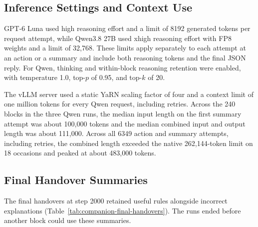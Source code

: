 \subsection{Inference Settings and Context Use}

GPT-6 Luna used high reasoning effort and a limit of 8192 generated tokens per request attempt, while Qwen3.8 27B used xhigh reasoning effort with FP8 weights and a limit of 32,768.
These limits apply separately to each attempt at an action or a summary and include both reasoning tokens and the final JSON reply.
For Qwen, thinking and within-block reasoning retention were enabled, with temperature 1.0, top-$p$ of 0.95, and top-$k$ of 20.

The vLLM server used a static YaRN scaling factor of four and a context limit of one million tokens for every Qwen request, including retries.
Across the 240 blocks in the three Qwen runs, the median input length on the first summary attempt was about 100,000 tokens and the median combined input and output length was about 111,000.
Across all 6349 action and summary attempts, including retries, the combined length exceeded the native 262,144-token limit on 18 occasions and peaked at about 483,000 tokens.

\newpage
\subsection{Final Handover Summaries}
\label{app:companion-final-handovers}

The final handovers at step 2000 retained useful rules alongside incorrect explanations (Table~\ref{tab:companion-final-handovers}).
The runs ended before another block could use these summaries.

